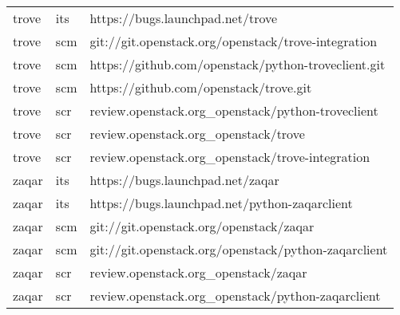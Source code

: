 \begin{center}
\begin{longtable}{|p{4cm}|p{1cm}|p{10cm}|}
trove&its&https://bugs.launchpad.net/trove\\ 
trove&scm&git://git.openstack.org/openstack/trove-integration\\ 
trove&scm&https://github.com/openstack/python-troveclient.git\\ 
trove&scm&https://github.com/openstack/trove.git\\ 
trove&scr&review.openstack.org\_openstack/python-troveclient\\ 
trove&scr&review.openstack.org\_openstack/trove\\ 
trove&scr&review.openstack.org\_openstack/trove-integration\\ 
zaqar&its&https://bugs.launchpad.net/zaqar\\ 
zaqar&its&https://bugs.launchpad.net/python-zaqarclient\\ 
zaqar&scm&git://git.openstack.org/openstack/zaqar\\ 
zaqar&scm&git://git.openstack.org/openstack/python-zaqarclient\\ 
zaqar&scr&review.openstack.org\_openstack/zaqar\\ 
zaqar&scr&review.openstack.org\_openstack/python-zaqarclient

\hline
\end{longtable}
\end{center}

 
